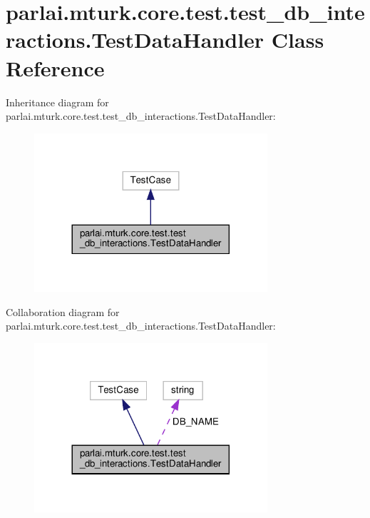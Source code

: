 \hypertarget{classparlai_1_1mturk_1_1core_1_1test_1_1test__db__interactions_1_1TestDataHandler}{}\section{parlai.\+mturk.\+core.\+test.\+test\+\_\+db\+\_\+interactions.\+Test\+Data\+Handler Class Reference}
\label{classparlai_1_1mturk_1_1core_1_1test_1_1test__db__interactions_1_1TestDataHandler}


Inheritance diagram for parlai.\+mturk.\+core.\+test.\+test\+\_\+db\+\_\+interactions.\+Test\+Data\+Handler\+:
\nopagebreak
\begin{figure}[H]
\begin{center}
\leavevmode
\includegraphics[width=245pt]{classparlai_1_1mturk_1_1core_1_1test_1_1test__db__interactions_1_1TestDataHandler__inherit__graph}
\end{center}
\end{figure}


Collaboration diagram for parlai.\+mturk.\+core.\+test.\+test\+\_\+db\+\_\+interactions.\+Test\+Data\+Handler\+:
\nopagebreak
\begin{figure}[H]
\begin{center}
\leavevmode
\includegraphics[width=245pt]{classparlai_1_1mturk_1_1core_1_1test_1_1test__db__interactions_1_1TestDataHandler__coll__graph}
\end{center}
\end{figure}
